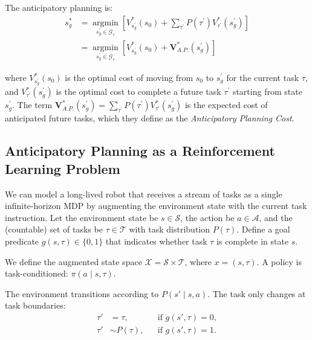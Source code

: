 \documentclass[10pt]{article} %
\begin{document}
The anticipatory planning is:
\begin{equation}
\label{eq:anticipatory_planning}
\begin{aligned}
    s_g^* &= \operatorname*{argmin}_{s_g^\prime \in \mathcal{G_\tau}}\left[V^*_{s_g^\prime}(s_0) + \sum_{\tau^\prime}{P(\tau^\prime) V^*_{\tau^\prime}(s_g^\prime)}\right] \\
    &= \operatorname*{argmin}_{s_g^\prime \in \mathcal{G_\tau}}\left[V^*_{s_g^\prime}(s_0) + \boldsymbol{V}^*_{A.P.}(s_g^\prime)\right]
\end{aligned}
\end{equation}

where $V^*_{s_g^\prime}(s_0)$ is the optimal cost of moving from  $s_0$ to $s_g^\prime$ for the current task $\tau$, and $V^*_{\tau^\prime}(s_g^\prime)$ is the optimal cost to complete a future task $\tau^\prime$ starting from state $s_g^\prime$.
The term $\boldsymbol{V}^*_{A.P.}(s_g^\prime) = \sum_{\tau^\prime}{P(\tau^\prime) V^*_{\tau^\prime}(s_g^\prime)}$ is the expected cost of anticipated future tasks, which they define as the \textit{Anticipatory Planning Cost}.

\subsection{Anticipatory Planning as a Reinforcement Learning Problem}

We can model a long-lived robot that receives a stream of tasks as a single infinite-horizon MDP by augmenting the environment state with the current task instruction. Let the environment state be $s \in \mathcal{S}$, the action be $a \in \mathcal{A}$, and the (countable) set of tasks be $\tau \in \mathcal{T}$ with task distribution $P(\tau)$. Define a goal predicate $g(s,\tau) \in \{0,1\}$ that indicates whether task $\tau$ is complete in state $s$.

We define the augmented state space $\mathcal{X} = \mathcal{S} \times \mathcal{T}$, where $x=(s,\tau)$. A policy is task-conditioned: $\pi(a \mid s,\tau)$.

The environment transitions according to $P(s'\mid s,a)$. The task only changes at task boundaries:
\begin{equation}
\label{eq:task_transition}
\begin{aligned}
    \tau' &= \tau, &&\text{if } g(s',\tau)=0, \\
    \tau' &\sim P(\tau), &&\text{if } g(s',\tau)=1.
\end{aligned}
\end{equation}
\end{document}

